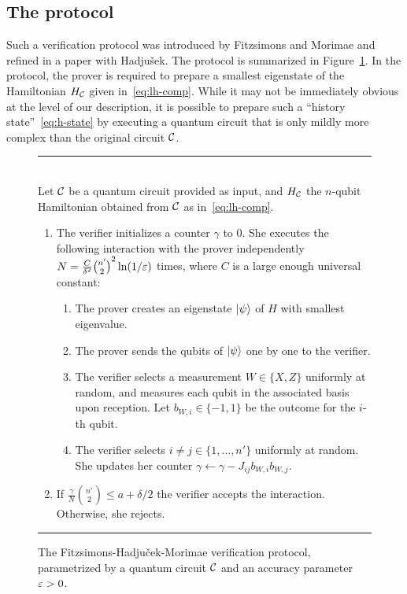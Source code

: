 \subsection{The protocol}
\label{sec:fm-protocol}

Such a verification protocol was introduced by Fitzsimons and Morimae and refined in a paper with Hadju\v{s}ek. The protocol is summarized in Figure~\ref{fig:fhm-protocol}. In the protocol, the prover is required to prepare a smallest eigenstate of the Hamiltonian $H_{\mathcal{C}}$ given in~\eqref{eq:lh-comp}. While it may not be immediately obvious at the level of our description, it is possible to prepare such a ``history state''~\eqref{eq:h-state} by executing a quantum circuit that is only mildly more complex than the original circuit $\mathcal{C}$. 

\begin{figure}[htbp]
\rule[1ex]{16.5cm}{0.5pt}\\
Let $\mathcal{C}$ be a quantum circuit provided as input, and $H_{\mathcal{C}}$ the $n$-qubit Hamiltonian obtained from $\mathcal{C}$ as in~\eqref{eq:lh-comp}. 
\begin{enumerate}
\item The verifier initializes a counter $\gamma$ to $0$. She executes the following interaction with the prover independently $N=\frac{C}{\delta^2} {n' \choose 2}^2 \ln(1/\varepsilon)$ times, where $C$ is a large enough universal constant:
\begin{enumerate}
\item The prover creates an eigenstate $|\psi\rangle$ of $H$ with smallest eigenvalue. 
\item The prover sends the qubits of $|\psi\rangle$ one by one to the verifier.
\item The verifier selects a measurement $W\in\{X,Z\}$ uniformly at random, and measures each qubit in the associated basis upon reception. Let $b_{W,i}\in\{-1,1\}$ be the outcome for the $i$-th qubit. 
\item The verifier selects $i\neq j \in \{1,\ldots,n'\}$ uniformly at random. She updates her counter $\gamma \leftarrow \gamma - J_{ij} b_{W,i} b_{W,j}$.
\end{enumerate}
\item If $\frac{\gamma}{N }{n' \choose 2} \leq a + \delta/2$ the verifier accepts the interaction. Otherwise, she rejects. 
\end{enumerate}
\rule[1ex]{16.5cm}{0.5pt}
\caption{The Fitzsimons-Hadju\v{c}ek-Morimae verification protocol, parametrized by a quantum circuit $\mathcal{C}$ and an accuracy parameter $\varepsilon>0$.}
\label{fig:fhm-protocol}
\end{figure}

